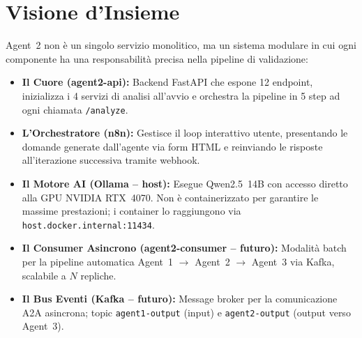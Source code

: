\documentclass[12pt,a4paper]{report}
\begin{document}
\section{Visione d'Insieme}

Agent~2 non è un singolo servizio monolitico, ma un sistema modulare in cui
ogni componente ha una responsabilità precisa nella pipeline di validazione:

\begin{itemize}
  \item \textbf{Il Cuore (agent2-api):} Backend FastAPI che espone 12 endpoint,
        inizializza i 4 servizi di analisi all'avvio e orchestra la pipeline
        in 5 step ad ogni chiamata \texttt{/analyze}.

  \item \textbf{L'Orchestratore (n8n):} Gestisce il loop interattivo utente,
        presentando le domande generate dall'agente via form HTML e reinviando
        le risposte all'iterazione successiva tramite webhook.

  \item \textbf{Il Motore AI (Ollama -- host):} Esegue Qwen2.5~14B con accesso
        diretto alla GPU NVIDIA RTX~4070. Non è containerizzato per garantire
        le massime prestazioni; i container lo raggiungono via
        \texttt{host.docker.internal:11434}.

  \item \textbf{Il Consumer Asincrono (agent2-consumer -- futuro):} Modalità
        batch per la pipeline automatica Agent~1 $\rightarrow$ Agent~2
        $\rightarrow$ Agent~3 via Kafka, scalabile a $N$ repliche.

  \item \textbf{Il Bus Eventi (Kafka -- futuro):} Message broker per la
        comunicazione A2A asincrona; topic \texttt{agent1-output} (input) e
        \texttt{agent2-output} (output verso Agent~3).
\end{itemize}
\end{document}
